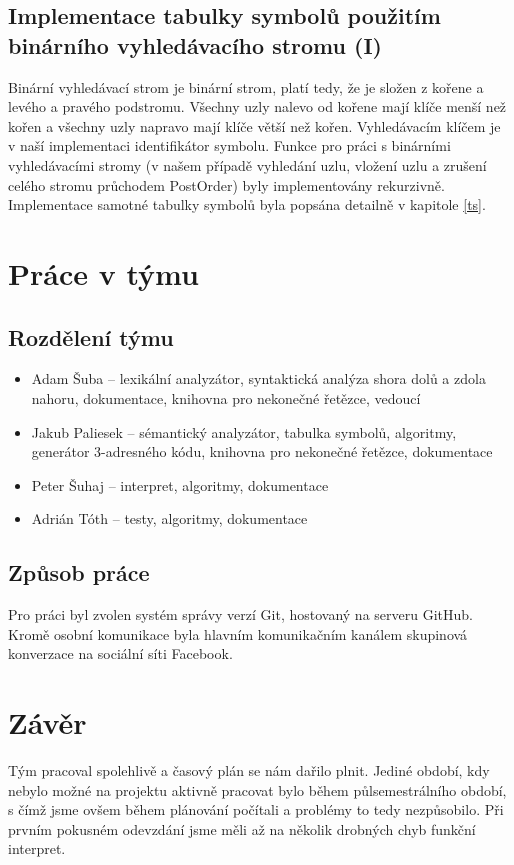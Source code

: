 \documentclass[a4paper, 11pt]{article}
\begin{document}
    \subsection{Implementace tabulky symbolů použitím binárního vyhledávacího stromu (I)}
    Binární vyhledávací strom je binární strom, platí tedy, že je složen z kořene a levého a pravého podstromu. Všechny uzly nalevo od kořene mají klíče menší než kořen a všechny uzly napravo mají klíče větší než kořen. Vyhledávacím klíčem je v naší implementaci identifikátor symbolu. Funkce pro práci s binárními vyhledávacími stromy (v našem případě vyhledání uzlu, vložení uzlu a zrušení celého stromu průchodem PostOrder) byly implementovány rekurzivně. Implementace samotné tabulky symbolů byla popsána detailně v kapitole \ref{ts}.
    \section{Práce v týmu}
    \subsection{Rozdělení týmu}
    \begin{itemize}
        \item Adam Šuba – lexikální analyzátor, syntaktická analýza shora dolů a zdola nahoru, dokumentace, knihovna pro nekonečné řetězce, vedoucí
        \item Jakub Paliesek – sémantický analyzátor, tabulka symbolů, algoritmy, generátor 3-adresného kódu, knihovna pro nekonečné řetězce, dokumentace
        \item Peter Šuhaj – interpret, algoritmy, dokumentace
        \item Adrián Tóth – testy, algoritmy, dokumentace
    \end{itemize}
    \subsection{Způsob práce}
    Pro práci byl zvolen systém správy verzí Git, hostovaný na serveru GitHub. Kromě osobní komunikace byla hlavním komunikačním kanálem skupinová konverzace na sociální síti Facebook.
    \section{Závěr}
    Tým pracoval spolehlivě a časový plán se nám dařilo plnit. Jediné období, kdy nebylo možné na projektu aktivně pracovat bylo během půlsemestrálního období, s čímž jsme ovšem během plánování počítali a problémy to tedy nezpůsobilo. Při prvním pokusném odevzdání jsme měli až na několik drobných chyb funkční interpret.
\end{document}
